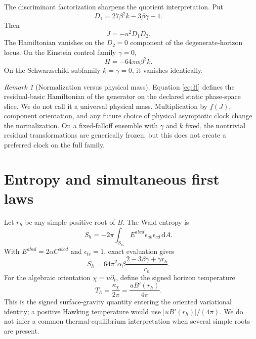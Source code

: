 \documentclass[11pt]{article}
\theoremstyle{definition}
\theoremstyle{remark}
\newtheorem{remark}[theorem]{Remark}
\newcommand{\dd}{\mathrm d}
\begin{document}
The discriminant factorization sharpens the quotient interpretation.  Put
\begin{equation}
 D_1=27\beta^2k-3\beta\gamma-1.
\end{equation}
Then
\begin{equation}\label{eq:Jfactor}
 J=-u^2D_1D_2.
\end{equation}
The Hamiltonian vanishes on the \(D_2=0\) component of the degenerate-horizon
locus.  On the Einstein control family \(\gamma=0\),
\begin{equation}
 H=-64\pi\alpha\beta^2k.
\end{equation}
On the Schwarzschild subfamily \(k=\gamma=0\), it vanishes identically.

\begin{remark}[Normalization versus physical mass]
Equation \eqref{eq:H} defines the residual-basic Hamiltonian of the
generator on the declared static phase-space slice.  We do not call it a
universal physical mass.  Multiplication by \(f(J)\), component orientation,
and any future choice of physical asymptotic clock change the normalization.
On a fixed-falloff ensemble with \(\gamma\) and \(k\) fixed, the nontrivial
residual transformations are generically frozen, but this does not create a
preferred clock on the full family.
\end{remark}

\section{Entropy and simultaneous first laws}

Let \(r_h\) be any simple positive root of \(B\).  The Wald entropy is
\begin{equation}\label{eq:wald}
 S_h=-2\pi\int_{S_{r_h}}E^{abcd}\epsilon_{ab}\epsilon_{cd}\,\dd A.
\end{equation}
With \(E^{abcd}=2\alpha C^{abcd}\) and \(\epsilon_{tr}=1\), exact evaluation
gives
\begin{equation}\label{eq:S}
 S_h=64\pi^2\alpha\beta
 \frac{2-3\beta\gamma+\gamma r_h}{r_h}.
\end{equation}
For the algebraic orientation \(\chi=u\partial_t\), define the signed
horizon temperature
\begin{equation}\label{eq:T}
 T_h=\frac{\kappa_\chi}{2\pi}
     =\frac{uB'(r_h)}{4\pi}.
\end{equation}
This is the signed surface-gravity quantity entering the oriented
variational identity; a positive Hawking temperature would use
\(|uB'(r_h)|/(4\pi)\).  We do not infer a common thermal-equilibrium
interpretation when several simple roots are present.
\end{document}
